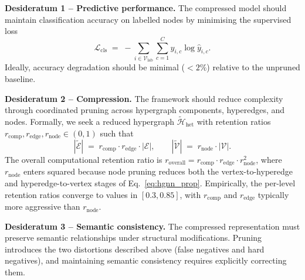\documentclass[10pt]{article}
\theoremstyle{plain}
\theoremstyle{definition}
\begin{document}
\textbf{Desideratum 1 -- Predictive performance.} The compressed model should maintain classification accuracy on labelled nodes by minimising the supervised loss
\begin{equation}
\mathcal{L}_{\mathrm{cls}} \;=\;
-\sum_{i\in\mathcal{V}_{\mathrm{lab}}}\sum_{c=1}^{C}
y_{i,c}\log\hat{y}_{i,c}.
\label{eq:cls_loss}
\end{equation}
Ideally, accuracy degradation should be minimal ($<\!2\%$) relative to the unpruned baseline.

\textbf{Desideratum 2 -- Compression.} The framework should reduce complexity through coordinated pruning across hypergraph components, hyperedges, and nodes. Formally, we seek a reduced hypergraph $\widetilde{\mathcal{H}}_{\mathrm{het}}$ with retention ratios $r_{\mathrm{comp}},r_{\mathrm{edge}},r_{\mathrm{node}}\!\in\! (0,1)$ such that
\begin{equation}
|\widetilde{\mathcal{E}}| \;=\; r_{\mathrm{comp}}\cdot
r_{\mathrm{edge}}\cdot|\mathcal{E}|,
\qquad
|\widetilde{\mathcal{V}}| \;=\;
r_{\mathrm{node}}\cdot|\mathcal{V}|.
\label{eq:retention_def}
\end{equation}
The overall computational retention ratio is $r_{\mathrm{overall}} = r_{\mathrm{comp}}\cdot r_{\mathrm{edge}} 
\cdot r_{\mathrm{node}}^{2}$, where $r_{\mathrm{node}}$ enters squared because node pruning reduces both the vertex-to-hyperedge and hyperedge-to-vertex stages of Eq.~\eqref{eq:hgnn_prop}. Empirically, the
per-level retention ratios converge to values in $[0.3,0.85]$, with $r_{\mathrm{comp}}$ and $r_{\mathrm{edge}}$
typically more aggressive than $r_{\mathrm{node}}$. 

\textbf{Desideratum 3 -- Semantic consistency.} The compressed representation must preserve semantic relationships under structural modifications. Pruning introduces the two distortions described above (false negatives and hard negatives), and maintaining semantic consistency requires explicitly correcting them.
\end{document}

